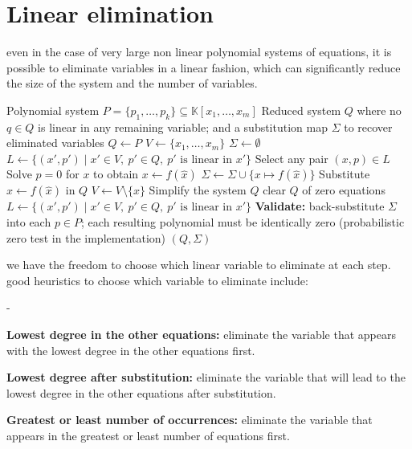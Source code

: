 \section*{Linear elimination}

even in the case of very large non linear polynomial systems of equations, it is possible to eliminate variables in a linear fashion, which can significantly reduce the size of the system and the number of variables.

\begin{algorithm}[H]
  \caption{Linear elimination by substitution}
  \label{alg:linear-elimination}
  \begin{algorithmic}[1]
    \Require Polynomial system $P=\{p_1,\dots,p_k\}\subseteq \mathbb{K}[x_1,\dots,x_m]$
    \Ensure Reduced system $Q$ where no $q\in Q$ is linear in any remaining variable; and a substitution map $\Sigma$ to recover eliminated variables
    \State $Q \gets P$
    \State $V \gets \{x_1,\dots,x_m\}$
    \State $\Sigma \gets \emptyset$
    \State $L \gets \{(x',p')\mid x'\in V,\ p'\in Q,\ p' \text{ is linear in } x'\}$
    \State Select any pair $(x,p)\in L$
    \State Solve $p=0$ for $x$ to obtain $x \gets f(\hat{x})$
    \State $\Sigma \gets \Sigma \cup \{x \mapsto f(\hat{x})\}$
    \State Substitute $x \gets f(\hat{x})$ in $Q$
    \State $V \gets V\setminus\{x\}$
    \State Simplify the system $Q$ 
    \State clear $Q$ of zero equations
    \State $L \gets \{(x',p')\mid x'\in V,\ p'\in Q,\ p' \text{ is linear in } x'\}$
    \EndWhile
    \State \textbf{Validate:} back-substitute $\Sigma$ into each $p \in P$; each resulting polynomial must be identically zero (probabilistic zero test in the implementation)
    \EndIf
    \State \Return $(Q,\Sigma)$
  \end{algorithmic}
\end{algorithm}

we have the freedom to choose which linear variable to eliminate at each step. good heuristics to choose which variable to eliminate include:
\begin{list}{-}{}
\item \textbf{Lowest degree in the other equations:} eliminate the variable that appears with the lowest degree in the other equations first.
\item \textbf{Lowest degree after substitution:} eliminate the variable that will lead to the lowest degree in the other equations after substitution.
\item \textbf{Greatest or least number of occurrences:} eliminate the variable that appears in the greatest or least number of equations first.
\end{list}

